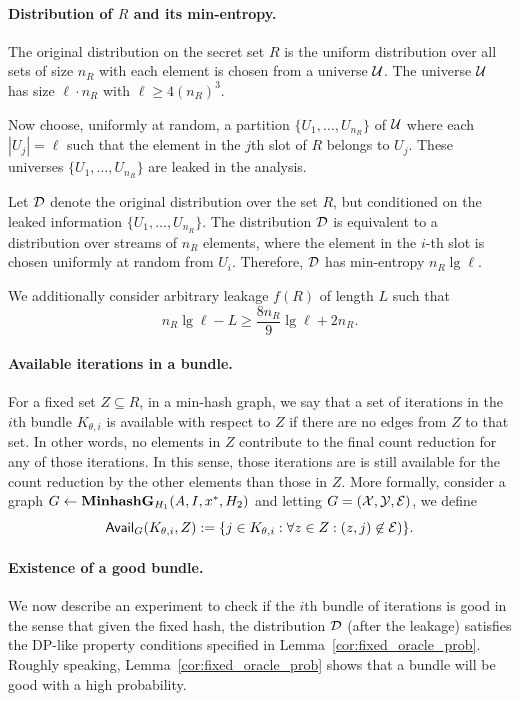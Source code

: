 \paragraph{Distribution of $R$ and its min-entropy.}
The original distribution on the secret set $R$ is the uniform distribution over
all sets of size $n_R$ with each element is chosen from a universe $\mathcal{U}$. The
universe $\mathcal{U}$ has size $\ell \cdot n_R$ with $\ell \ge 4(n_R)^3$.
   
Now choose, uniformly at random, a partition $\{U_1, \ldots, U_{n_R}\}$ of $\mathcal{U}$
where each $|U_j| = \ell$ such that the element in the $j$th slot of $R$ belongs
to $U_j$. These universes $\{U_1, \ldots, U_{n_R}\}$ are leaked in the analysis.

Let ${\cal D}$ denote the
    original distribution over the set $R$, but conditioned on the leaked information $\{ U_1, \ldots, U_{n_R} \}$. The distribution ${\cal D}$ is equivalent to a distribution over streams of $n_R$ elements,
    where the element in the $i$-th slot is chosen uniformly at random from $U_i$.
    Therefore, ${\cal D}$ has min-entropy 
    $n_R \lg \ell$.

We additionally consider arbitrary leakage $f(R)$
of length $L$ such that 
\[n_R \lg \ell - L \ge  \frac{8n_R}{9} \lg \ell + 2n_R.\]

\paragraph{Available iterations in a bundle.}
For a fixed set $Z \subseteq R$, in a min-hash graph, 
we say that a set of iterations in the $i$th bundle $K_{\theta, i}$ is available
with respect to $Z$ if there are no edges from $Z$ to that set. In other words, no elements in $Z$ contribute to the final count reduction for any of those iterations. In this
sense, those iterations are is still available for the count reduction by the other elements than those in
$Z$. 
More formally, consider a graph $G \leftarrow {\bf MinhashG}_{H_1}(A, I, {x^*}, H_2)$ and letting $G = (\mathcal{X}, \mathcal{Y}, \mathcal{E})$, we define 
\[ \mathsf{Avail}_G(K_{\theta,i}, Z) := \{ j \in K_{\theta, i}:  \forall z \in Z: (z, j) \not \in  \mathcal{E})\}.  \]

\paragraph{Existence of a good bundle.}
We now describe an experiment to check if the $i$th bundle of iterations is good
in the sense that given the fixed hash, the distribution ${\cal D}$ (after the
leakage) satisfies the DP-like property conditions specified in
Lemma~\ref{cor:fixed_oracle_prob}. Roughly speaking, Lemma~\ref{cor:fixed_oracle_prob}
shows that a bundle will be good with a high probability. %
\medskip

